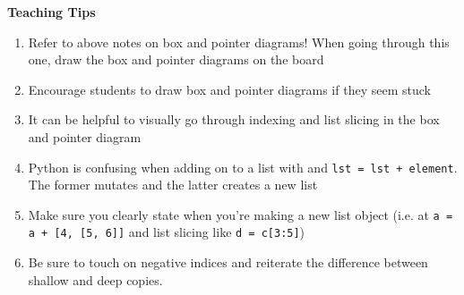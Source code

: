     \begin{questionmeta}
        \textbf{Teaching Tips}
        \begin{enumerate}
                \item Refer to above notes on box and pointer diagrams! When going through this one, draw the box and pointer diagrams on the board
                \item Encourage students to draw box and pointer diagrams if they seem stuck
                \item It can be helpful to visually go through indexing and list slicing in the box and pointer diagram
                \item Python is confusing when adding on to a list with  and \lstinline{lst = lst + element}. The former mutates and the latter creates a new list
                \item Make sure you clearly state when you’re making a new list object (i.e. at \lstinline{a = a + [4, [5, 6]]} and list slicing like \lstinline{d = c[3:5]})
                \item Be sure to touch on negative indices and reiterate the difference between shallow and deep copies.
        \end{enumerate}
    \end{questionmeta}